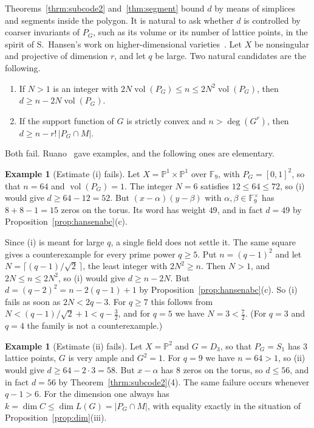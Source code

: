 \documentclass[12pt,letterpaper]{article}
\numberwithin{equation}{section}
\theoremstyle{definition}
\newtheorem{example}[theorem]{Example}
\theoremstyle{remark}
\DeclareMathOperator{\vol}{vol}
\newcommand{\F}{\mathbb{F}}
\newcommand{\PP}{\mathbb{P}}
\begin{document}
Theorems~\ref{thrm:subcode2} and~\ref{thm:segment} bound $d$ by means of
simplices and segments inside the polygon. It is natural to ask whether $d$ is
controlled by coarser invariants of $P_G$, such as its volume or its number of
lattice points, in the spirit of S.~Hansen's work on higher-dimensional
varieties~\cite{SH96}. Let $X$ be nonsingular and projective of dimension $r$,
and let $q$ be large. Two natural candidates are the following.
\begin{enumerate}[label=(\roman*)]
\item If $N>1$ is an integer with $2N\vol(P_G)\le n\le2N^2\vol(P_G)$, then
$d\ge n-2N\vol(P_G)$.
\item If the support function of $G$ is strictly convex and $n>\deg(G^r)$, then
$d\ge n-r!\,|P_G\cap M|$.
\end{enumerate}
Both fail. Ruano~\cite{Ru07} gave examples, and the following ones are
elementary.

\begin{example}[Estimate (i) fails]\label{ex:conj1}
Let $X=\PP^1\times\PP^1$ over $\F_9$, with $P_G=[0,1]^2$, so that $n=64$ and
$\vol(P_G)=1$. The integer $N=6$ satisfies $12\le64\le72$, so (i) would give
$d\ge64-12=52$. But $(x-\alpha)(y-\beta)$ with
$\alpha,\beta\in\F_9^\times$ has $8+8-1=15$ zeros on the torus. Its word has
weight $49$, and in fact $d=49$ by Proposition~\ref{prop:hansenabc}(c).

Since (i) is meant for large $q$, a single field does not settle it. The same
square gives a counterexample for every prime power $q\ge5$. Put
$n=(q-1)^2$ and let $N=\lceil(q-1)/\sqrt2\,\rceil$, the least integer with
$2N^2\ge n$. Then $N>1$, and $2N\le n\le2N^2$, so (i) would give
$d\ge n-2N$. But $d=(q-2)^2=n-2(q-1)+1$ by
Proposition~\ref{prop:hansenabc}(c). So (i) fails as soon as $2N<2q-3$. For
$q\ge7$ this follows from $N<(q-1)/\sqrt2+1<q-\tfrac32$, and for $q=5$ we have
$N=3<\tfrac72$. (For $q=3$ and $q=4$ the family is not a counterexample.)
\end{example}

\begin{example}[Estimate (ii) fails]\label{ex:conj2}
Let $X=\PP^2$ and $G=D_3$, so that $P_G=S_1$ has $3$ lattice points, $G$ is
very ample and $G^2=1$. For $q=9$ we have $n=64>1$, so (ii) would give
$d\ge64-2\cdot3=58$. But $x-\alpha$ has $8$ zeros on the torus, so
$d\le56$, and in fact $d=56$ by Theorem~\ref{thrm:subcode2}(4). The same
failure occurs whenever $q-1>6$. For the dimension one always has
$k=\dim C\le\dim L(G)=|P_G\cap M|$, with equality exactly in the situation of
Proposition~\ref{prop:dim}(iii).
\end{example}
\end{document}
